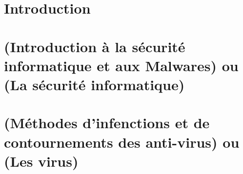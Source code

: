 \documentclass[12pt]{report}
\begin{document}


\renewcommand{\contentsname}{Sommaire}
\tableofcontents
\listoffigures
\listoftables

\chapter*{Introduction}



\chapter{(Introduction à la sécurité informatique et aux Malwares) ou (La sécurité informatique)}


\chapter{(Méthodes d'infenctions et de contournements des anti-virus) ou (Les virus)}

\end{document}
